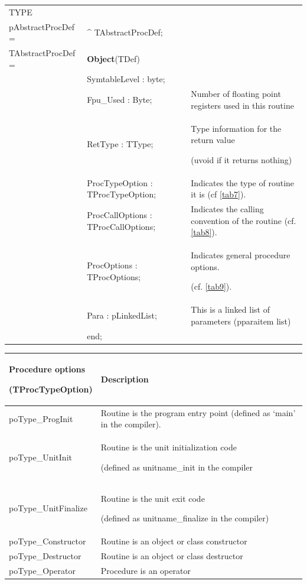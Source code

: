 \documentclass [a4paper,12pt]{article}
\begin{document}
\begin{tabular*}{6.5in}{|l@{\extracolsep{\fill}}lp{5.2cm}|}
\hline
\textsf{TYPE}& & \\
\xspace pAbstractProcDef = & \^{}  TAbstractProcDef; & \\
\xspace \textsf{TAbstractProcDef} = & \textbf{Object}(TDef) & \\
&\textsf{SymtableLevel : byte;}&  \\
&\textsf{Fpu{\_}Used : Byte;}&
	Number of floating point registers used in this routine  \\
&\textsf{RetType : TType;}&
	Type information for the return value \par (uvoid if it returns nothing) \\
&\textsf{ProcTypeOption : TProcTypeOption;} &
	Indicates the type of routine it is (cf \ref{tab7}). \\
&\textsf{ProcCallOptions : TProcCallOptions;} &
	Indicates the calling convention of the routine (cf. \ref{tab8}). \\
&\textsf{ProcOptions : TProcOptions;}&
	Indicates general procedure options.  \par (cf. \ref{tab9}). \\
&\textsf{Para : pLinkedList;}&
	This is a linked list of parameters (pparaitem list) \\
&\textsf{end;}&  \\
\hline
\end{tabular*}

\begin{longtable}{|l|p{10cm}|}
\hline
Procedure options  \par (TProcTypeOption)& Description \\
\hline
\endhead
\hline
\endfoot
\textsf{poType{\_}ProgInit}&
	Routine is the program entry point (defined as `\textsf{main}' in
	the compiler). \\
\textsf{poType{\_}UnitInit}&
	Routine is the unit initialization code \par (defined as
	unitname\textsf{{\_}init} in the compiler \\
\textsf{poType{\_}UnitFinalize}&
	Routine is the unit exit code \par (defined as
	unitname\textsf{{\_}finalize} in the compiler) \\
\textsf{poType{\_}Constructor}&
	Routine is an object or class constructor \\
\textsf{poType{\_}Destructor}&
	Routine is an object or class destructor \\
\textsf{poType{\_}Operator}&
	Procedure is an operator \\
\end{longtable}
\end{document}
